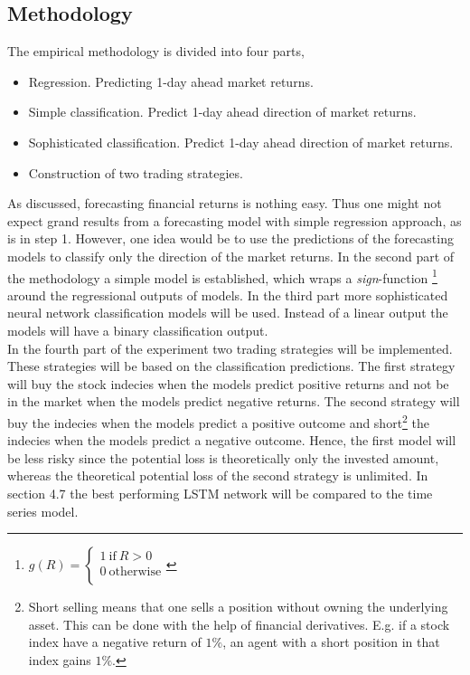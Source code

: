 \documentclass[12pt, letterpaper]{amsart}%
\begin{document}
\subsection{Methodology}
The empirical methodology is divided into four parts,

\begin{itemize}  
\item Regression. Predicting 1-day ahead market returns.
\item Simple classification. Predict 1-day ahead direction of market returns.
\item Sophisticated classification. Predict 1-day ahead direction of market returns.
\item Construction of two trading strategies.
\end{itemize}

As discussed, forecasting financial returns is nothing easy. Thus one might not expect grand results from a forecasting model with simple regression approach, as is in step 1. However, one idea would be to use the predictions of the forecasting models to classify only the direction of the market returns. In the second part of the methodology a simple model is established, which wraps a \textit{sign}-function \footnote{$g(R) = 
     \begin{cases}
       1 \ \text{if} \ R > 0 \\
       0 \ \text{otherwise} \\ 
     \end{cases}$} around the regressional outputs of models. In the third part more sophisticated neural network classification models will be used. Instead of a linear output the models will have a binary classification output.
\\

In the fourth part of the experiment two trading strategies will be implemented. These strategies will be based on the classification predictions. The first strategy will buy the stock indecies when the models predict positive returns and not be in the market when the models predict negative returns. The second strategy will buy the indecies when the models predict a positive outcome and short\footnote{Short selling means that one sells a position without owning the underlying asset. This can be done with the help of financial derivatives. E.g. if a stock index have a negative return of $1\%$, an agent with a short position in that index gains $1\%$.} the indecies when the models predict a negative outcome. Hence, the first model will be less risky since the potential loss is theoretically only the invested amount, whereas the theoretical potential loss of the second strategy is unlimited. In section 4.7 the best performing LSTM network will be compared to the time series model.
\\
\end{document}
